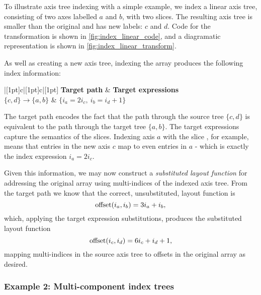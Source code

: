 \documentclass[thesis]{subfiles}
\begin{document}
To illustrate axis tree indexing with a simple example, we index a linear axis tree, consisting of two axes labelled $a$ and $b$, with two slices.
The resulting axis tree is smaller than the original and has new labels: $c$ and $d$.
Code for the transformation is shown in \cref{fig:index_linear_code}, and a diagramatic representation is shown in \cref{fig:index_linear_transform}.

As well as creating a new axis tree, indexing the array produces the following index information:
\begin{center}
  \begin{tblr}{|[1pt]c|[1pt]c|[1pt]}
    \hline[1pt]
    \textbf{Target path} & \textbf{Target expressions} \\
    \hline[1pt]
    $\{ c, d \} \to \{a, b\}$ & $\{i_a = 2 i_c,\ i_b = i_d+1\}$ \\
    \hline[1pt]
  \end{tblr}
\end{center}
The target path encodes the fact that the path through the source tree $\{c,d\}$ is equivalent to the path through the target tree $\{a,b\}$.
The target expressions capture the semantics of the slices.
Indexing axis $a$ with the slice \pycode{[::2]}, for example, means that entries in the new axis $c$ map to even entries in $a$ - which is exactly the index expression $i_a = 2i_c$.

Given this information, we may now construct a \emph{substituted layout function} for addressing the original array using multi-indices of the indexed axis tree.
From the target path we know that the correct, unsubstituted, layout function is
\begin{equation}
  \textnormal{offset}(i_a, i_b) = 3 i_a + i_b,
\end{equation}
which, applying the target expression substitutions, produces the substituted layout function
\begin{equation}
  \textnormal{offset}(i_c, i_d) = 6 i_c + i_d + 1,
\end{equation}
mapping multi-indices in the source axis tree to offsets in the original array as desired.

\subsubsection{Example 2: Multi-component index trees}
\end{document}
